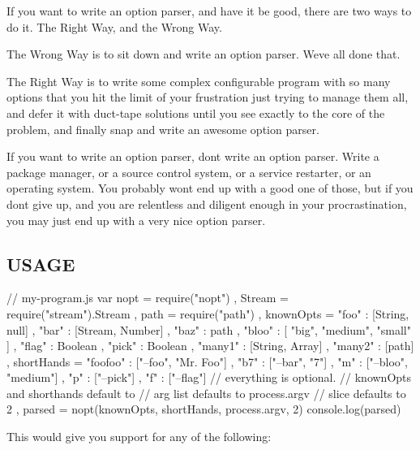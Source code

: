 If you want to write an option parser, and have it be good, there are two ways to do it. The Right Way, and the Wrong Way.

The Wrong Way is to sit down and write an option parser. We\textquotesingle{}ve all done that.

The Right Way is to write some complex configurable program with so many options that you hit the limit of your frustration just trying to manage them all, and defer it with duct-\/tape solutions until you see exactly to the core of the problem, and finally snap and write an awesome option parser.

If you want to write an option parser, don\textquotesingle{}t write an option parser. Write a package manager, or a source control system, or a service restarter, or an operating system. You probably won\textquotesingle{}t end up with a good one of those, but if you don\textquotesingle{}t give up, and you are relentless and diligent enough in your procrastination, you may just end up with a very nice option parser.

\subsection*{U\+S\+A\+GE}

\begin{DoxyVerb}// my-program.js
var nopt = require("nopt")
  , Stream = require("stream").Stream
  , path = require("path")
  , knownOpts = { "foo" : [String, null]
                , "bar" : [Stream, Number]
                , "baz" : path
                , "bloo" : [ "big", "medium", "small" ]
                , "flag" : Boolean
                , "pick" : Boolean
                , "many1" : [String, Array]
                , "many2" : [path]
                }
  , shortHands = { "foofoo" : ["--foo", "Mr. Foo"]
                 , "b7" : ["--bar", "7"]
                 , "m" : ["--bloo", "medium"]
                 , "p" : ["--pick"]
                 , "f" : ["--flag"]
                 }
             // everything is optional.
             // knownOpts and shorthands default to {}
             // arg list defaults to process.argv
             // slice defaults to 2
  , parsed = nopt(knownOpts, shortHands, process.argv, 2)
console.log(parsed)
\end{DoxyVerb}


This would give you support for any of the following\+:


